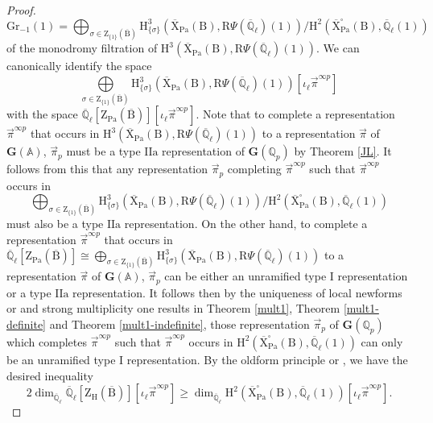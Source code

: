 \documentclass[10pt]{amsart}
\numberwithin{equation}{section}
\theoremstyle{definition}
\def\Pa{\mathrm{Pa}}
\def\bfG{\mathbf{G}}
\def\QQ{\mathbb{Q}}
\def\rmB{\mathrm{B}}
\def\rmH{\mathrm{H}}
\def\rmI{\mathrm{I}}
\def\rmR{\mathrm{R}}
\def\rmX{\mathrm{X}}
\def\rmZ{\mathrm{Z}}
\begin{document}
\begin{proof}
\begin{equation*}
\mathrm{Gr}_{-1}(1)=\bigoplus_{\sigma\in \rmZ_{\{1\}}(\overline{\rmB})}\rmH^{3}_{\{\sigma\}}(\overline{\rmX}_{\Pa}(\rmB), \rmR\Psi(\overline{\QQ}_{\ell})(1))/\rmH^{2}(\overline{\rmX}^{\square}_{\Pa}(\rmB), \overline{\QQ}_{\ell}(1))
\end{equation*}
of the monodromy filtration of $\rmH^{3}(\overline{\rmX}_{\Pa}(\rmB), \rmR\Psi(\overline{\QQ}_{\ell})(1))$.
We can canonically identify the space 
\begin{equation*}
\bigoplus\limits_{\sigma\in \rmZ_{\{1\}}(\overline{\rmB})}\rmH^{3}_{\{\sigma\}}(\overline{\rmX}_{\Pa}(\rmB), \rmR\Psi(\overline{\QQ}_{\ell})(1))[\iota_{\ell}\vec{\pi}^{\infty p}] 
\end{equation*}
with the space $\overline{\QQ}_{\ell}[\rmZ_{\Pa}(\overline{\rmB})][\iota_{\ell}\vec{\pi}^{\infty p}]$. Note that to complete a representation $\vec{\pi}^{\infty p}$ that occurs in $\rmH^{3}(\overline{\rmX}_{\Pa}(\rmB), \rmR\Psi(\overline{\QQ}_{\ell})(1))$ to a representation $\vec{\pi}$ of $\bfG(\mathbb{A})$, $\vec{\pi}_{p}$ must be  a type $\mathrm{II}\mathrm{a}$ representation of  $\bfG(\QQ_{p})$ by Theorem \ref{JL}.  It follows from this that any representation $\vec{\pi}_{p}$ completing  $\vec{\pi}^{\infty p}$ such that $\vec{\pi}^{\infty p}$ occurs in
\begin{equation*}
\bigoplus_{\sigma\in \rmZ_{\{1\}}(\overline{\rmB})}\rmH^{3}_{\{\sigma\}}(\overline{\rmX}_{\Pa}(\rmB), \rmR\Psi(\overline{\QQ}_{\ell})(1))/\rmH^{2}(\overline{\rmX}^{\square}_{\Pa}(\rmB), \overline{\QQ}_{\ell}(1))
\end{equation*}
must also be a type $\mathrm{IIa}$ representation. On the other hand,  to complete a representation $\vec{\pi}^{\infty p}$ that occurs in $\overline{\QQ}_{\ell}[\rmZ_{\Pa}(\overline{\rmB})]\cong\bigoplus_{\sigma\in \rmZ_{\{1\}}(\overline{\rmB})}\rmH^{3}_{\{\sigma\}}(\overline{\rmX}_{\Pa}(\rmB), \rmR\Psi(\overline{\QQ}_{\ell})(1))$ to a representation $\vec{\pi}$ of $\bfG(\mathbb{A})$, $\vec{\pi}_{p}$  can be either an unramified type $\mathrm{I}$ representation or a type $\mathrm{II}\mathrm{a}$ representation. It follows then by the uniqueness of local newforms \cite[Theorem 5.6.1]{BS-newform} or \cite[Theorem 2.3.1]{Sch-Iwahori} and strong multiplicity one results in Theorem \ref{mult1}, Theorem \ref{mult1-definite} and Theorem \ref{mult1-indefinite}, those representation $\vec{\pi}_{p}$ of $\bfG(\QQ_{p})$ which completes $\vec{\pi}^{\infty p}$ such that $\vec{\pi}^{\infty p}$ occurs in $\rmH^{2}(\overline{\rmX}^{\square}_{\Pa}(\rmB), \overline{\QQ}_{\ell}(1))$ can only be an unramified type $\rmI$ representation. By the oldform principle \cite[Theorem 5.6.1]{BS-newform} or \cite[Theorem 2.3.1]{Sch-Iwahori},  we have the desired inequality
\begin{equation*}
2\dim_{\overline{\QQ}_{\ell}} \overline{\QQ}_{\ell}[\rmZ_{\rmH}(\overline{\rmB})][\iota_{\ell}\vec{\pi}^{\infty p}]\geq \dim_{\overline{\QQ}_{\ell}}\rmH^{2}(\overline{\rmX}^{\square}_{\Pa}(\rmB), \overline{\QQ}_{\ell}(1))[\iota_{\ell}\vec{\pi}^{\infty p}].
\end{equation*}


\end{proof}
\end{document}
